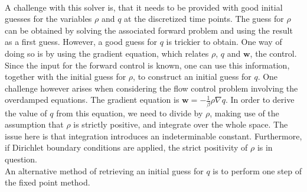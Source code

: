 \documentclass[11pt, a4paper]{article}
\theoremstyle{definition}
\newcommand{\adj}{q}
\begin{document}
\\
A challenge with this solver is, that it needs to be provided with good initial guesses for the variables $\rho$ and $\adj$ at the discretized time points. The guess for $\rho$ can be obtained by solving the associated forward problem and using the result as a first guess. However, a good guess for $\adj$ is trickier to obtain. One way of doing so is by using the gradient equation, which relates $\rho$, $\adj$ and $\mathbf w$, the control. Since the input for the forward control is known, one can use this information, together with the initial guess for $\rho$, to construct an initial guess for $\adj$. 
One challenge however arises when considering the flow control problem involving the overdamped equations. The gradient equation is $\mathbf{w} = - \frac{1}{\beta} \rho\nabla \adj$. In order to derive the value of $\adj$ from this equation, we need to divide by $\rho$, making use of the assumption that $\rho$ is strictly positive, and integrate over the whole space. The issue here is that integration introduces an indeterminable constant. Furthermore, if Dirichlet boundary conditions are applied, the strict positivity of $\rho$ is in question.\\
An alternative method of retrieving an initial guess for $\adj$ is to perform one step of the fixed point method.
\end{document}
